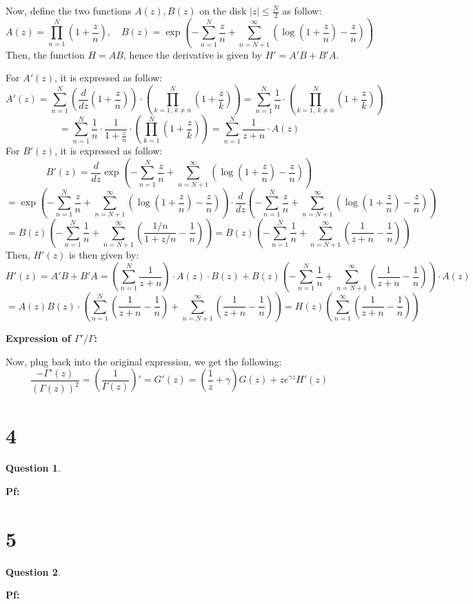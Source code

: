 \documentclass{article}
\newtheorem{question}{Question}
\begin{document}
\hfil

Now, define the two functions $A(z),B(z)$ on the disk $|z|\leq \frac{N}{2}$ as follow:
$$A(z)=\prod_{n=1}^{N}\left(1+\frac{z}{n}\right),\quad B(z)=\exp\left(-\sum_{n=1}^{N}\frac{z}{n}+\sum_{n=N+1}^{\infty}\left(\log\left(1+\frac{z}{n}\right)-\frac{z}{n}\right)\right)$$
Then, the function $H=AB$, hence the derivative is given by $H'=A'B+B'A$.

For $A'(z)$, it is expressed as follow:
$$A'(z)=\sum_{n=1}^{N}\left(\frac{d}{dz}\left(1+\frac{z}{n}\right)\right)\cdot \left(\prod_{k=1,\ k\neq n}^{N}\left(1+\frac{z}{k}\right)\right)=\sum_{n=1}^{N}\frac{1}{n}\cdot\left(\prod_{k=1,\ k\neq n}^{N}\left(1+\frac{z}{k}\right)\right)$$
$$=\sum_{n=1}^{N}\frac{1}{n}\cdot\frac{1}{1+\frac{z}{n}}\cdot\left(\prod_{k=1}^{N}\left(1+\frac{z}{k}\right)\right) = \sum_{n=1}^{N}\frac{1}{z+n}\cdot A(z)$$
For $B'(z)$, it is expressed as follow:
$$B'(z)=\frac{d}{dz}\exp\left(-\sum_{n=1}^{N}\frac{z}{n}+\sum_{n=N+1}^{\infty}\left(\log\left(1+\frac{z}{n}\right)-\frac{z}{n}\right)\right)$$
$$=\exp\left(-\sum_{n=1}^{N}\frac{z}{n}+\sum_{n=N+1}^{\infty}\left(\log\left(1+\frac{z}{n}\right)-\frac{z}{n}\right)\right)\cdot \frac{d}{dz}\left(-\sum_{n=1}^{N}\frac{z}{n}+\sum_{n=N+1}^{\infty}\left(\log\left(1+\frac{z}{n}\right)-\frac{z}{n}\right)\right)$$
$$= B(z)\left(-\sum_{n=1}^{N}\frac{1}{n}+\sum_{n=N+1}^{\infty}\left(\frac{1/n}{1+z/n}-\frac{1}{n}\right)\right) =B(z)\left(-\sum_{n=1}^{N}\frac{1}{n}+\sum_{n=N+1}^{\infty}\left(\frac{1}{z+n}-\frac{1}{n}\right)\right)$$
Then, $H'(z)$ is then given by:
$$H'(z)=A'B+B'A = \left(\sum_{n=1}^{N}\frac{1}{z+n}\right)\cdot A(z)\cdot B(z)+B(z)\left(-\sum_{n=1}^{N}\frac{1}{n}+\sum_{n=N+1}^{\infty}\left(\frac{1}{z+n}-\frac{1}{n}\right)\right)\cdot A(z)$$
$$=A(z)B(z)\cdot\left(\sum_{n=1}^{N}\left(\frac{1}{z+n}-\frac{1}{n}\right)+\sum_{n=N+1}^{\infty}\left(\frac{1}{z+n}-\frac{1}{n}\right)\right)= H(z)\left(\sum_{n=1}^{\infty}\left(\frac{1}{z+n}-\frac{1}{n}\right)\right)$$

\hfil

\textbf{Expression of $\Gamma'/\Gamma$:}

Now, plug back into the original expression, we get the following:
$$\frac{-\Gamma'(z)}{(\Gamma(z))^2}=\left(\frac{1}{\Gamma(z)}\right)'=G'(z)=\left(\frac{1}{z}+\gamma\right)G(z)+ze^{\gamma z}H'(z)$$

\break

\section*{4}
\begin{myBox}[]{}
    \begin{question}
        
    \end{question}
\end{myBox}

\textbf{Pf:}

\break

\section*{5}
\begin{myBox}[]{}
    \begin{question}
        
    \end{question}
\end{myBox}

\textbf{Pf:}
\end{document}
